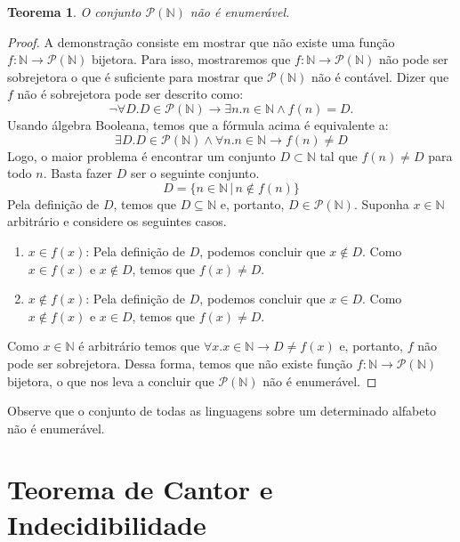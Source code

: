 \documentclass[a4paper]{article}
\newtheorem{Theorem}{Teorema}
\theoremstyle{definition}
\begin{document}
  \begin{Theorem}
    O conjunto $\mathcal{P}(\mathbb{N})$ não é enumerável.
  \end{Theorem}
  \begin{proof}
    A demonstração consiste em mostrar que não existe uma função $f : \mathbb{N}
    \to \mathcal{P}(\mathbb{N})$ bijetora. Para isso, mostraremos que
    $f : \mathbb{N} \to \mathcal{P}(\mathbb{N})$ não pode ser sobrejetora o que
    é suficiente para mostrar que $\mathcal{P}(\mathbb{N})$ não é contável.
    Dizer que $f$ não é sobrejetora pode ser descrito como:
    \[
      \neg \forall D . D \in \mathcal{P}(\mathbb{N}) \to \exists n. n \in \mathbb{N} \land f(n) = D.
    \]
    Usando álgebra Booleana, temos que a fórmula acima é equivalente a:
    \[
      \exists D. D \in \mathcal{P}(\mathbb{N}) \land \forall n. n\in\mathbb{N}
      \to f(n) \neq D
    \]
    Logo, o maior problema é encontrar um conjunto $D \subset \mathbb{N}$ tal
    que $f(n) \neq D$ para todo $n$. Basta fazer $D$ ser o seguinte conjunto.
    \[
      D = \{n \in \mathbb{N}\,|\,n \not\in f(n)\}
    \]
    Pela definição de $D$, temos que $D\subseteq \mathbb{N}$ e, portanto,
    $D \in \mathcal{P}(\mathbb{N})$. Suponha $x \in \mathbb{N}$ arbitrário e
    considere os seguintes casos.
    \begin{enumerate}
      \item $x \in f(x)$: Pela definição de $D$, podemos concluir que $x \not\in
        D$. Como $x \in f(x)$ e $x\not\in D$, temos que $f(x) \neq D$.
      \item $x \not\in f(x)$: Pela definição de $D$, podemos concluir que $x \in
        D$. Como $x\not\in f(x)$ e $x\in D$, temos que $f(x) \neq D$.
    \end{enumerate}
    Como $x\in\mathbb{N}$ é arbitrário temos que $\forall x. x\in\mathbb{N} \to
    D \neq f(x)$ e, portanto, $f$ não pode ser sobrejetora. Dessa forma, temos
    que não existe função $f : \mathbb{N} \to \mathcal{P}(\mathbb{N})$ bijetora,
    o que nos leva a concluir que  $\mathcal{P}(\mathbb{N})$ não é enumerável.
  \end{proof}

  Observe que o conjunto de todas as linguagens sobre um determinado alfabeto
  não é enumerável. 

  \section{Teorema de Cantor e Indecidibilidade}
\end{document}
